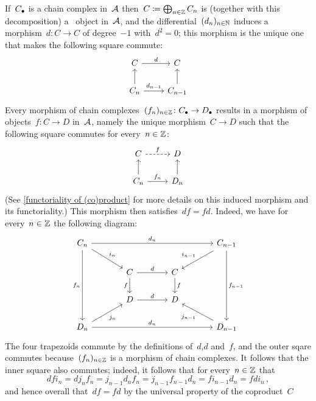 \begin{remark}
\begin{enumerate}
      If~$C_\bullet$ is a chain complex in~$\mathcal{A}$ then~$C \coloneqq \bigoplus_{n \in \mathbb{Z}} C_n$ is (together with this decomposition) a~ object in~$\mathcal{A}$, and the differential~$(d_n)_{n \in \mathbb{N}}$ induces a morphism~$d \colon C \to C$ of degree~$-1$ with~$d^2 = 0$;
      this morphism is the unique one that makes the following square commute:
      \[
        \begin{tikzcd}
            C
            \arrow{r}[above]{d}
          & C
          \\
            C_n
            \arrow{u}
            \arrow{r}[above]{d_{n-1}}
          & C_{n-1}
            \arrow{u}
        \end{tikzcd}
      \]
      Every morphism of chain complexes~$(f_n)_{n \in \mathbb{Z}} \colon C_\bullet \to D_\bullet$ results in a morphism of~ objects~$f \colon C \to D$ in~$\mathcal{A}$, namely the unique morphism~$C \to D$ such that the following square commutes for every~$n \in \mathbb{Z}$:
      \[
        \begin{tikzcd}
            C
            \arrow[dashed]{r}[above]{f}
          & D
          \\
            C_n
            \arrow{u}
            \arrow{r}[above]{f_n}
          & D_n
            \arrow{u}
        \end{tikzcd}
      \]
      (See \cref{functoriality of (co)product} for more details on this induced morphism and its functoriality.)
      This morphism then satisfies~$df = fd$.
      Indeed, we have for every~$n \in \mathbb{Z}$ the following diagram:
      \[
        \begin{tikzcd}[column sep = large]
            C_n
            \arrow{rrr}[above]{d_n}
            \arrow{dr}[above right]{i_n}
            \arrow{ddd}[left]{f_n}
          & {}
          & {}
          & C_{n-1}
            \arrow{dl}[above left]{i_{n-1}}
            \arrow{ddd}[right]{f_{n-1}}
        \\
            {}
          & C
            \arrow{r}[above]{d}
            \arrow{d}[left]{f}
          & C
            \arrow{d}[right]{f}
          & {}
          \\
            {}
          & D
            \arrow{r}[above]{d}
          & D
          & {}
          \\
            D_n
            \arrow{ur}[below right]{j_n}
            \arrow{rrr}[above]{d_n}
          & {}
          & {}
          & D_{n-1}
            \arrow{ul}[below left]{j_{n-1}}
        \end{tikzcd}
      \]
      The four trapezoids commute by the definitions of~$d$,$d$ and~$f$, and the outer sqare commutes because~$(f_n)_{n \in \mathbb{Z}}$ is a morphism of chain complexes.
      It follows that the inner square also commutes;
      indeed, it follows that for every~$n \in \mathbb{Z}$ that
      \[
          d f i_n
        = d j_n f_n
        = j_{n-1} d_n f_n
        = j_{n-1} f_{n-1} d_n
        = f i_{n-1} d_n
        = f d i_n \,,
      \]
      and hence overall that~$df = fd$ by the universal property of the coproduct~$C$
      

\end{enumerate}
\end{remark}
